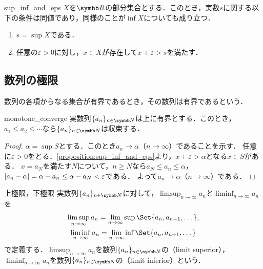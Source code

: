 \documentclass[../../main]{subfiles}
\begin{document}
\begin{proposition}{}{sup_inf_and_eps}
  \(X\)を\(\numset{R}\)の部分集合とする．このとき，実数\(s\)に関する以下の条件は同値であり，同様のことが\(\inf X\)についても成り立つ．
  \begin{enumerate}
    \item \(s=\sup X\)である．
    \item 任意の\(\varepsilon>0\)に対し，\(x\in X\)が存在して\(x+\varepsilon>s\)を満たす．
  \end{enumerate}
\end{proposition}

\subsection{数列の極限}

数列の各項からなる集合が有界であるとき，その数列は有界であるという．

\begin{proposition}{}{monotone_converge}
  実数列\(\seq{a_n}_{n\in\numset{N}}\)は上に有界とする．このとき，\(a_1\leq a_2\leq\dotsb\)なら\(\seq{a_n}_{n\in\numset{N}}\)は収束する．
\end{proposition}

\begin{proof}
  \(\alpha=\sup S\)とする．このとき\(a_n\to\alpha\)（\(n\to\infty\)）であることを示す．
  任意に\(\varepsilon>0\)をとる．\cref{proposition:sup_inf_and_eps}より，\(x+\varepsilon>\alpha\)となる\(x\in S\)がある．
  \(x=a_N\)を満たす\(N\)について，\(n\geq N\)なら\(a_N\leq a_n\leq\alpha\)，\(\lvert a_n-\alpha\rvert=\alpha-a_n\leq\alpha-a_N<\varepsilon\)である．
  よって\(a_n\to\alpha\)（\(n\to\infty\)）である．
\end{proof}

\begin{definition}{上極限，下極限}{}
  実数列\(\seq{a_n}_{n\in\numset{N}}\)に対して，\(\limsup_{n\to\infty}a_n\)と\(\liminf_{n\to\infty}a_n\)を
  \begin{gather*}
    \limsup_{n\to\infty}a_n = \lim_{n\to\infty}\sup\Set{a_n,a_{n+1},\dotsc}, \\
    \liminf_{n\to\infty}a_n = \lim_{n\to\infty}\inf\Set{a_n,a_{n+1},\dotsc}
  \end{gather*}
  で定義する．\(\limsup_{n\to\infty}a_n\)を数列\(\seq{a_n}_{n\in\numset{N}}\)の（limit superior），
  \(\liminf_{n\to\infty}a_n\)を数列\(\seq{a_n}_{n\in\numset{N}}\)の（limit inferior）という．
\end{definition}
\end{document}
